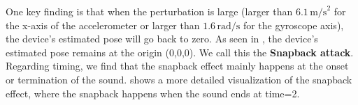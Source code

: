 One key finding is that when the perturbation is large (\eg larger than $6.1\,\text{m/s}^2$ for the x-axis of the accelerometer or larger than $1.6\,\text{rad/s}$ for the gyroscope axis), the device's estimated pose will go back to zero.
As seen in , the device's estimated pose remains at the origin (0,0,0).
We call this the \textbf{Snapback attack}.
Regarding timing, we find that the snapback effect mainly happens at the onset or termination of the sound.
 shows a more detailed visualization of the snapback effect, where the snapback happens when the sound ends at time=2.

